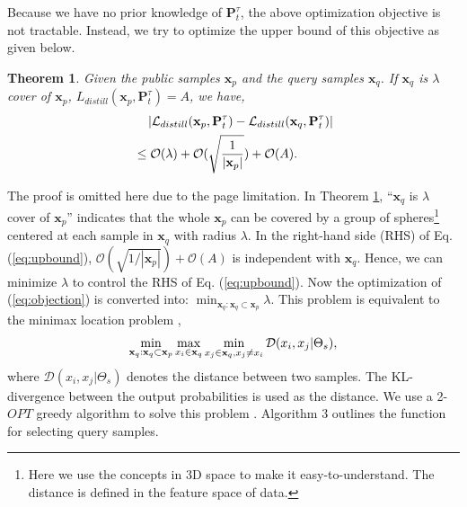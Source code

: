 \documentclass[letterpaper]{article} %
\newtheorem{thm}{Theorem}
\begin{document}
Because we have no prior knowledge of $\textbf{P}_t^\tau$, the above optimization objective is not tractable. Instead, we try to optimize the upper bound of this objective as given below.

\begin{thm}\label{thm:core}
Given the public samples $\textbf{x}_p$ and the query samples $\textbf{x}_q$. If $\textbf{x}_q$ is $\lambda$ cover of $\textbf{x}_p $, ${{L_{distill}}({\textbf{x}_p},\textbf{P}_t^\tau )}=A$, we have,
\begin{equation}\label{eq:upbound}
\begin{aligned}
& \quad \left| {{{\mathcal L}_{distill}}({{\textbf{x}}_p},{\textbf{P}}_t^\tau ) - {{\mathcal L}_{distill}}({{\textbf{x}}_q},{\textbf{P}}_t^\tau )} \right| \\
& \le {\mathcal O}(\lambda ) + {\mathcal O}(\sqrt {{1 \over {|{{\textbf{x}}_p}|}}} ) + {\mathcal O}(A).
\end{aligned}
\end{equation}
\end{thm}

The proof is omitted here due to the page limitation. In Theorem \ref{thm:core}, ``$\textbf{x}_q$ is $\lambda$ cover of $\textbf{x}_p $'' indicates that the whole $\textbf{x}_p$ can be covered by a group of spheres\footnote{Here we use the concepts in 3D space to make it easy-to-understand. The distance is defined in the feature space of data.} centered at each sample in $\textbf{x}_q$ with radius $\lambda$. In the right-hand side (RHS) of Eq. (\ref{eq:upbound}), ${\mathcal O}(\sqrt {{1 / {|{{\textbf{x}}_p}|}}} ) + {\mathcal O}(A)$ is independent with $\textbf{x}_q$. Hence, we can minimize $\lambda$ to control the RHS of Eq. (\ref{eq:upbound}). Now the optimization of (\ref{eq:objection}) is converted into: $\min _{\textbf{x}_q:\textbf{x}_q \subset \textbf{x}_p}\lambda$. This problem is equivalent to the minimax location problem \cite{korupolu2000analysis},
\begin{equation}
\mathop {\min }\limits_{{{\bf{x}}_q}:{{\bf{x}}_q} \subset {{\bf{x}}_p}} \mathop {\max }\limits_{{x_i} \in {{\bf{x}}_q}} \mathop {\min }\limits_{{x_j} \in {{\bf{x}}_q},{x_j} \ne {x_i}} \mathcal{D} ({x_i},{x_j}| \Theta_s),
\end{equation}
where $\mathcal{D} ({x_i},{x_j}| \Theta_s)$ denotes the distance between two samples. The KL-divergence between the output probabilities is used as the distance. We use a 2-$OPT$ greedy algorithm to solve this problem \cite{korupolu2000analysis}. Algorithm 3 outlines the function for selecting query samples.
\end{document}
